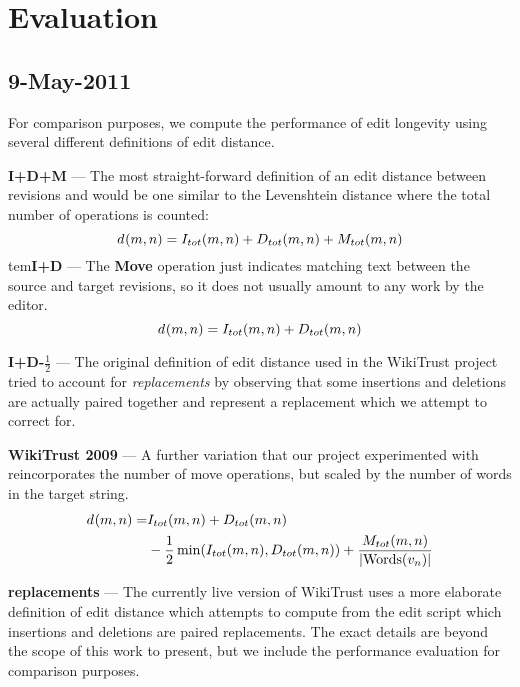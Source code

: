 \section{Evaluation}

\subsection{9-May-2011}

For comparison purposes, we compute the performance of edit longevity
using several different definitions of edit distance.
\begin{description}
\item{\textbf{I+D+M}} --- The most straight-forward definition of an edit
        distance between revisions  and  would be one
        similar to the Levenshtein distance where
        the total number of operations is counted:
        \begin{equation}
            \dist{}{m,n} = I_{tot}(m,n) + D_{tot}(m,n) + M_{tot}(m,n)
        \label{eq:dist-idm}
        \end{equation}
tem{\textbf{I+D}} --- The \textbf{Move} operation just indicates
        matching text between the source and target revisions,
        so it does not usually amount to any work by the editor.
        \begin{equation}
            \dist{}{m,n} = I_{tot}(m,n) + D_{tot}(m,n)
        \label{eq:dist-id}
        \end{equation}
\item{\textbf{I+D-$\frac{1}{2}$}} --- The original definition of edit
        distance used in the WikiTrust project tried to account for
        \textit{replacements} by observing that some insertions and
        deletions are actually paired together and represent a
        replacement which we attempt to correct for.
\item{\textbf{WikiTrust 2009}} --- A further variation that our
        project experimented with reincorporates the number of
        move operations, but scaled by the number of words in
        the target string.
        \begin{align}
            d_{}(m,n) =& I_{tot}(m,n) + D_{tot}(m,n) \\
                & - \frac{1}{2}\min(I_{tot}(m,n), D_{tot}(m,n))
                + \frac{M_{tot}(m,n)}{| \mathrm{Words}(v_{n}) |}
        \end{align}
\item{\textbf{replacements}} --- The currently live version of
        WikiTrust uses a more elaborate definition of edit distance
        which attempts to compute from the edit script
        which insertions and deletions
        are paired replacements.
        The exact details are beyond the scope of this work to present,
        but we include the performance evaluation for comparison purposes.
\end{description}


